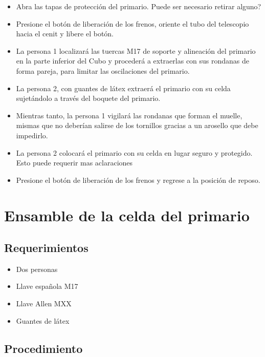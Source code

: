 \begin{itemize}
\item Abra las tapas de protección del primario. Puede ser necesario retirar alguno?
\item Presione el botón de liberación de los frenos, oriente el tubo del telescopio hacia el cenit y libere el botón. 
\item La persona 1 localizará las tuercas M17 de soporte y alineación del primario en la parte inferior del Cubo y procederá a extraerlas con sus rondanas de forma pareja, para limitar las oscilaciones del primario.
\item La persona 2, con guantes de látex extraerá el primario con su celda sujetándolo a través del boquete del primario.
\item Mientras tanto, la persona 1 vigilará las rondanas que forman el muelle, mismas que no deberían salirse de los tornillos gracias a un arosello que debe impedirlo.
\item La persona 2 colocará el primario con su celda en lugar seguro y protegido. Esto puede requerir mas aclaraciones
\item Presione el botón de liberación de los frenos y regrese a la posición de reposo.
\end{itemize}

\section{Ensamble de la celda del primario}

\subsection{Requerimientos}

\begin{itemize}
\item Dos personas
\item Llave española M17
\item Llave Allen MXX
\item Guantes de látex
\end{itemize}

\subsection{Procedimiento}

